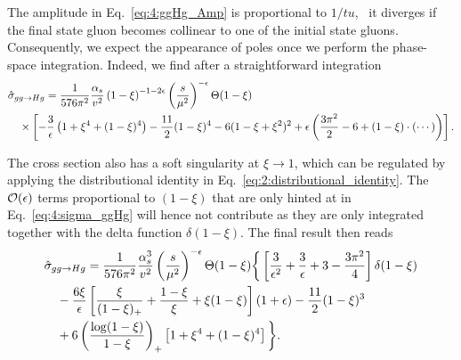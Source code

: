 The amplitude in Eq.~\eqref{eq:4:ggHg_Amp} is proportional to $1/tu$, \ie\ it diverges if the final state gluon becomes collinear to one of the initial state gluons. Consequently, we expect the appearance of poles once we perform the phase-space integration. Indeed, we find after a straightforward integration
\begin{equation}
\begin{split}
& \hat{\sigma}_{gg \rightarrow H g} = \frac{1}{576 \pi^2} \frac{\alpha_s}{v^2} \left(1 - \xi \right)^{-1 - 2 \epsilon} \left( \frac{s}{\mu^2} \right)^{-\epsilon} \Theta (1 - \xi) \\
& \quad \times \left[ - \frac{3}{\epsilon} \left(1 + \xi^4 + (1 - \xi)^4 \right) - \frac{11}{2} (1 - \xi)^4 - 6 (1 - \xi + \xi^2)^2 + \epsilon \left( \frac{3 \pi^2}{2} - 6 + (1 - \xi)\cdot \left(\cdots \right) \right) \right].
\label{eq:4:sigma_ggHg}
\end{split}
\end{equation}

The cross section also has a soft singularity at $\xi \rightarrow 1$, which can be regulated by applying the distributional identity in Eq.~\eqref{eq:2:distributional_identity}. The $\mathcal{O}\!\left(\epsilon\right)$ terms proportional to $(1 - \xi)$ that are only hinted at in Eq.~\eqref{eq:4:sigma_ggHg} will hence not contribute as they are only integrated together with the delta function $\delta (1 - \xi)$. The final result then reads
\begin{equation}
\begin{split}
& \hat{\sigma}_{gg \rightarrow H g} = \frac{1}{576 \pi^2} \frac{\alpha_s^3}{v^2} \left(\frac{s}{\mu^2} \right)^{-\epsilon} \Theta (1 - \xi) \bigg \lbrace \left[ \frac{3}{\epsilon^2} + \frac{3}{\epsilon} + 3 - \frac{3 \pi^2}{4} \right] \delta(1 - \xi) \\
&\quad - \frac{6 \xi}{\epsilon} \left[ \frac{\xi}{(1 - \xi)_+} + \frac{1 - \xi}{\xi} + \xi (1 - \xi) \right] (1 + \epsilon) - \frac{11}{2} (1 - \xi)^3 \\
& \quad + 6 \left(\frac{\log (1 - \xi)}{1 - \xi} \right)_+ \left[1 + \xi^4 + (1 - \xi)^4 \right]  \bigg \rbrace.
\end{split}
\label{eq:4:sigma_ggHg_full}
\end{equation}

